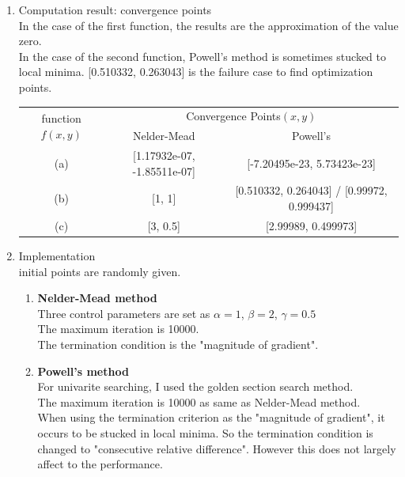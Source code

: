 \documentclass[12pt,letterpaper]{article}
\begin{document}
\begin{enumerate}
\item Computation result: convergence points
\\ In the case of the first function, the results are the approximation of the value zero.
\\ In the case of the second function, Powell's method is sometimes stucked to local minima.
[0.510332, 0.263043] is the failure case to find optimization points.
\begin{center}
  \begin{tabular}{| c | c | c |} \hline
      \multirow{2}{*}{function $f(x, y)$}   & \multicolumn{2}{c|}{Convergence Points$(x, y)$} \\ \cline{2-3}
                                            & Nelder-Mead & Powell's  \\ \hline
      (a)                                   & [1.17932e-07, -1.85511e-07] & [-7.20495e-23, 5.73423e-23] \\ 
      (b)                                   & [1, 1] & [0.510332, 0.264043] / [0.99972, 0.999437]\\ 
      (c)                                   & [3, 0.5]  & [2.99989, 0.499973] \\
      \hline
  \end{tabular}
\end{center}
\item Implementation
  \\ initial points are randomly given. 
  \begin{enumerate}
    \item \textbf{Nelder-Mead method}
    \\ Three control parameters are set as $\alpha=1$, $\beta=2$, $\gamma=0.5$
    \\ The maximum iteration is 10000.
    \\ The termination condition is the "magnitude of gradient".

    \newpage

    \item \textbf{Powell's method}
    \\ For univarite searching, I used the golden section search method.
    \\ The maximum iteration is 10000 as same as Nelder-Mead method.
    \\ When using the termination criterion as the "magnitude of gradient", 
    it occurs to be stucked in local minima.
    So the termination condition is changed to "consecutive relative difference". 
    However this does not largely affect to the performance.


\end{enumerate}
\end{enumerate}
\end{document}
